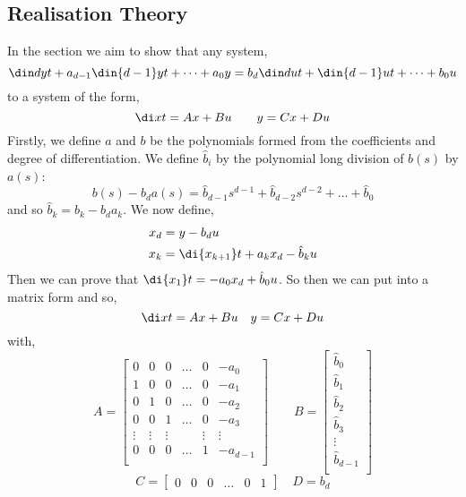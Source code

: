 \subsection{Realisation Theory}
In the section we aim to show that any system,
$$ \din d y t + a_{d-1}\din {d-1} y t + \dots + a_0y = b_d\din d u t + \din {d-1} u t + \dots + b_0u$$
to a system of the form,
$$ \di x t = Ax + Bu \qquad y = Cx + Du $$
Firstly, we define $a$ and $b$ be the polynomials formed from the coefficients and degree of differentiation. We define $\hat b_i$ by the polynomial long division of $b(s)$ by $a(s)$:
$$ b(s) - b_da(s) = \hat b_{d-1}s^{d-1} + \hat b_{d-2}s^{d-2} + \dots + \hat b_0 $$
and so $\hat b_k = b_k - b_da_k$. We now define,
\begin{align*}
  x_d &= y - b_du \\
  x_k &= \di {x_{k+1}} t + a_kx_d - \hat b_k u
\end{align*}
Then we can prove that $\di {x_1} t = -a_0x_d + \hat b_0u$. So then we can put into a matrix form and so,
$$ \di x t = Ax + Bu \quad y = Cx + Du $$
with,
$$ A = \begin{bmatrix}
  0 & 0 & 0 & \dots & 0 & -a_0\\
  1 & 0 & 0 & \dots & 0 & -a_1\\
  0 & 1 & 0 & \dots & 0 & -a_2\\
  0 & 0 & 1 & \dots & 0 & -a_3\\
  \vdots & \vdots & \vdots && \vdots &\vdots \\
  0 & 0 & 0 & \dots & 1 & -a_{d-1}\\
\end{bmatrix} \qquad B = \begin{bmatrix}
  \hat b_0 \\ \hat b_1 \\ \hat b_2 \\ \hat b_3 \\ \vdots \\ \hat b_{d-1} \\
\end{bmatrix}$$
$$ C = \begin{bmatrix}
  0 & 0 & 0 & \dots & 0 & 1
\end{bmatrix} \quad D = b_d$$

